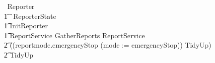\documentclass{report} %
\begin{document}
\begin{circus}
    \circprocess\ Reporter \circdef \circbegin \\

        \t1 \circstate\ ReporterState  \\ %
        \t1 InitReporter  \\ %
        \t1 ReportService \circdef GatherReports \circseq ReportService \extchoice \\ %
            \t2 ((reportmode.emergencyStop \then (mode := emergencyStop)) \circseq TidyUp) \extchoice \\%
            \t2 TidyUp \\

\end{circus}
\end{document}
